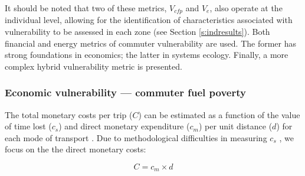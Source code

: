 It should be noted that two of these metrics, $V_{cfp}$ and $V_e$, also
operate at the individual level, allowing for the identification of
characteristics associated with vulnerability to be assessed in each zone
(see Section \ref{s:indresults}).
Both financial and energy metrics of commuter vulnerability are
used. The former has strong foundations in economics; the latter in systems
ecology. Finally, a more complex hybrid vulnerability metric is presented.

\subsubsection{Economic vulnerability --- commuter fuel poverty}
The total monetary costs per trip ($C$) can be estimated as a function of the
value of time lost ($c_s$) and direct monetary expenditure ($c_m$) per unit
distance ($d$) for each mode of transport \citep{Ommeren2006}. Due to
methodological difficulties in measuring $c_s$ \citep{Mokhtarian2001}, we
focus on the the direct monetary costs:

\begin{equation}
 C = c_m \times d
\end{equation}


